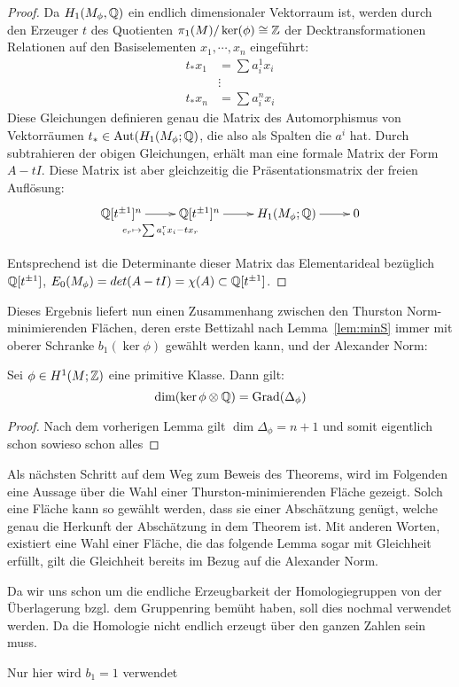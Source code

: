 \begin{proof}
	Da $H_1(M_\phi,\mathbb{Q})$ ein endlich dimensionaler Vektorraum ist, werden durch den Erzeuger $t$ des Quotienten $\pi_1(M)/\ker(\phi) \cong \mathbb{Z}$ der Decktransformationen Relationen auf den Basiselementen $x_1,\cdots,x_n$ eingeführt:	
	\begin{align*}
		t_*x_1 &= \sum a_i^1 x_i \\
				&\vdots \\
		t_*x_n &= \sum a_i^n x_i
	\end{align*}
	Diese Gleichungen definieren genau die Matrix des Automorphismus von Vektorräumen $t_* \in \operatorname{Aut} (H_1(M_\phi;\mathbb{Q})$, die also als Spalten die $a^i$ hat. Durch subtrahieren der obigen Gleichungen, erhält man eine formale Matrix der Form $A-tI$. Diese Matrix ist aber gleichzeitig die Präsentationsmatrix der freien Auflösung:
	\[
		\begin{xy}
			\xymatrix@L+5pt{\laurent \QQ t ^n \ar[r]_{e_r\mapsto \sum a_i^rx_i-tx_r} & \laurent \QQ t ^n \ar[r] & H_1(M_\phi;\QQ) \ar[r] &0\\}
		\end{xy}
	\]
	Entsprechend ist die Determinante dieser Matrix das Elementarideal bezüglich $\mathbb{Q}[t^{\pm 1}]$, $E_0(M_\phi)=det(A-tI)=\chi(A) \subset \mathbb{Q}[t^{\pm 1}] $. 
\end{proof}

Dieses Ergebnis liefert nun einen Zusammenhang zwischen den Thurston Norm-minimierenden Flächen, deren erste Bettizahl nach Lemma~\ref{lem:minS} immer mit oberer Schranke $b_1(\ker\phi)$ gewählt werden kann, und der Alexander Norm:
\begin{cor}
	Sei $\phi \in H^1(M;\mathbb{Z})$ eine primitive Klasse. Dann gilt:
	\[
		\dim(\ker\phi \otimes \mathbb{Q}) = \operatorname{Grad}(\Delta_\phi) 
	\]
\end{cor}
\begin{proof}
	Nach dem vorherigen Lemma gilt $\dim \Delta_\phi = n+1$ und somit %
	eigentlich schon sowieso schon alles 
\end{proof}




Als nächsten Schritt auf dem Weg zum Beweis des Theorems, wird im Folgenden eine Aussage über die Wahl einer Thurston-minimierenden Fläche gezeigt. Solch eine Fläche kann so gewählt werden, dass sie einer Abschätzung genügt, welche genau die Herkunft der Abschätzung in dem Theorem ist. Mit anderen Worten, existiert eine Wahl einer Fläche, die das folgende Lemma sogar mit Gleichheit erfüllt, gilt die Gleichheit bereits im Bezug auf die Alexander Norm.


Da wir uns schon um die endliche Erzeugbarkeit der Homologiegruppen von der Überlagerung bzgl. dem Gruppenring bemüht haben, soll dies nochmal verwendet werden. Da die Homologie nicht endlich erzeugt über den ganzen Zahlen sein muss.


Nur hier wird $b_1=1$ verwendet
    
